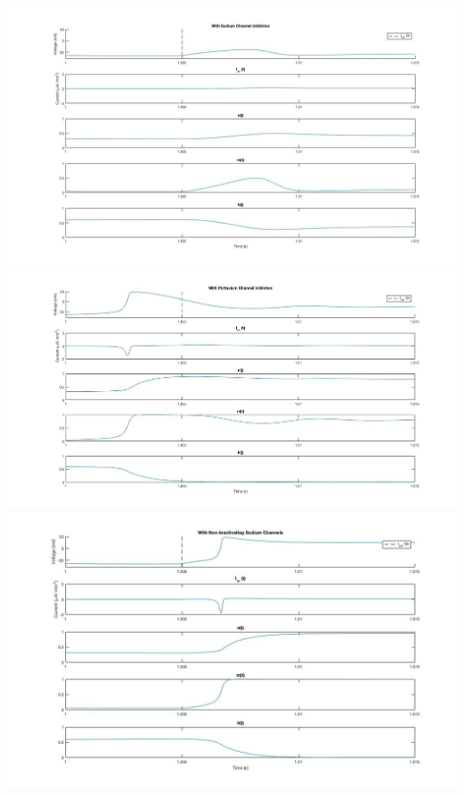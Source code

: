 \documentclass{121Temp}
\begin{document}
\hwproblem
\includegraphics[scale=.45]{NaBlock.jpg}
\includegraphics[scale=.45]{KBlock.jpg}
\includegraphics[scale=.45]{persistentNa.jpg}
\end{document}
